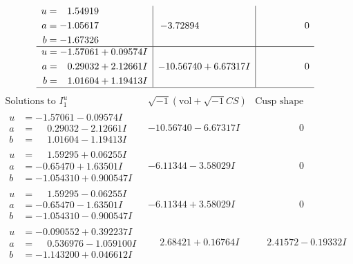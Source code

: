 \documentclass[1p]{elsarticle_modified}
\theoremstyle{definition}
\newcommand{\I}{\sqrt{-1}}
\begin{document}
$$\begin{array}{c|c|c}
\begin{aligned}
u &= \phantom{-}1.54919\phantom{ +0.000000I} \\
a &= -1.05617\phantom{ +0.000000I} \\
b &= -1.67326\phantom{ +0.000000I}\end{aligned}
 & -3.72894\phantom{ +0.000000I} & \phantom{-0.000000 } 0 \\ \hline\begin{aligned}
u &= -1.57061 + 0.09574 I \\
a &= \phantom{-}0.29032 + 2.12661 I \\
b &= \phantom{-}1.01604 + 1.19413 I\end{aligned}
 & -10.56740 + 6.67317 I & \phantom{-0.000000 } 0\\
 \hline 
 \end{array}$$\newpage$$\begin{array}{c|c|c}  
\text{Solutions to }I^u_{1}& \I (\text{vol} + \sqrt{-1}CS) & \text{Cusp shape}\\
 \hline 
\begin{aligned}
u &= -1.57061 - 0.09574 I \\
a &= \phantom{-}0.29032 - 2.12661 I \\
b &= \phantom{-}1.01604 - 1.19413 I\end{aligned}
 & -10.56740 - 6.67317 I & \phantom{-0.000000 } 0 \\ \hline\begin{aligned}
u &= \phantom{-}1.59295 + 0.06255 I \\
a &= -0.65470 + 1.63501 I \\
b &= -1.054310 + 0.900547 I\end{aligned}
 & -6.11344 - 3.58029 I & \phantom{-0.000000 } 0 \\ \hline\begin{aligned}
u &= \phantom{-}1.59295 - 0.06255 I \\
a &= -0.65470 - 1.63501 I \\
b &= -1.054310 - 0.900547 I\end{aligned}
 & -6.11344 + 3.58029 I & \phantom{-0.000000 } 0 \\ \hline\begin{aligned}
u &= -0.090552 + 0.392237 I \\
a &= \phantom{-}0.536976 - 1.059100 I \\
b &= -1.143200 + 0.046612 I\end{aligned}
 & \phantom{-}2.68421 + 0.16764 I & \phantom{-}2.41572 - 0.19332 I \\ \hline\begin{aligned}

\end{aligned}
\end{array}$$
\end{document}
